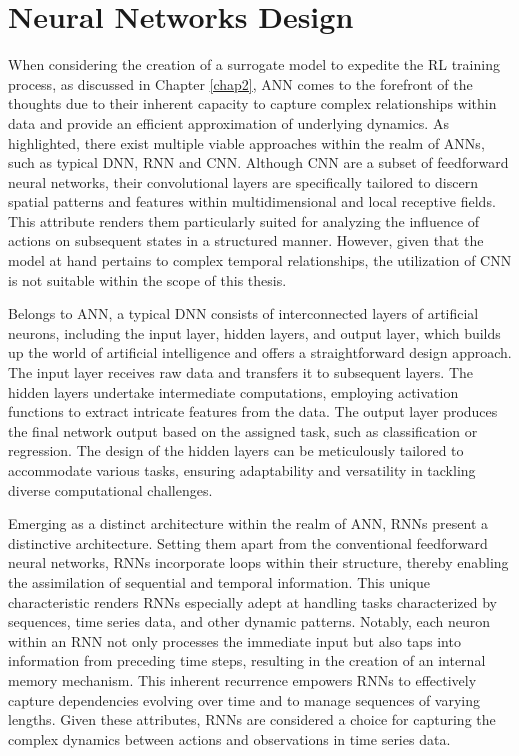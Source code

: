 \section{Neural Networks Design}
\label{sec:NN_design}
When considering the creation of a surrogate model to expedite the RL training process, as discussed in Chapter \ref{chap2}, \ac{ANN} comes to the forefront of the thoughts due to their inherent capacity to capture complex relationships within data and provide an efficient approximation of underlying dynamics. As highlighted, there exist multiple viable approaches within the realm of \ac{ANN}s, such as typical \ac{DNN}, \ac{RNN} and \ac{CNN}. Although \ac{CNN}  are a subset of feedforward neural networks, their convolutional layers are specifically tailored to discern spatial patterns and features within multidimensional and local receptive fields. This attribute renders them particularly suited for analyzing the influence of actions on subsequent states in a structured manner. However, given that the model at hand pertains to complex temporal relationships, the utilization of \ac{CNN} is not suitable within the scope of this thesis.

Belongs to \ac{ANN}, a typical \ac{DNN} consists of interconnected layers of artificial neurons, including the input layer, hidden layers, and output layer, which builds up the world of artificial intelligence and offers a straightforward design approach. The input layer receives raw data and transfers it to subsequent layers. The hidden layers undertake intermediate computations, employing activation functions to extract intricate features from the data. The output layer produces the final network output based on the assigned task, such as classification or regression. The design of the hidden layers can be meticulously tailored to accommodate various tasks, ensuring adaptability and versatility in tackling diverse computational challenges. 

Emerging as a distinct architecture within the realm of \ac{ANN}, \ac{RNN}s present a distinctive architecture. Setting them apart from the conventional feedforward neural networks, \ac{RNN}s incorporate loops within their structure, thereby enabling the assimilation of sequential and temporal information. This unique characteristic renders \ac{RNN}s especially adept at handling tasks characterized by sequences, time series data, and other dynamic patterns. Notably, each neuron within an \ac{RNN} not only processes the immediate input but also taps into information from preceding time steps, resulting in the creation of an internal memory mechanism. This inherent recurrence empowers \ac{RNN}s to effectively capture dependencies evolving over time and to manage sequences of varying lengths. Given these attributes, \ac{RNN}s are considered a choice for capturing the complex dynamics between actions and observations in time series data.

